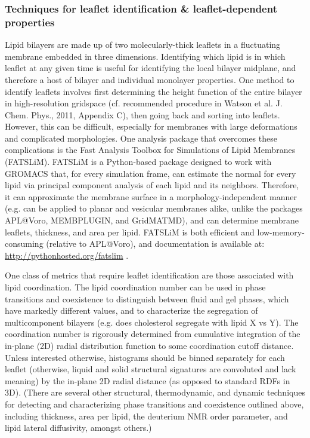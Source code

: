 \documentclass[9pt,bestpractices]{livecoms}
\begin{document}
\subsubsection{Techniques for leaflet identification \& leaflet-dependent properties}
\label{subsubsec:leafid-props}
Lipid bilayers are made up of two molecularly-thick leaflets in a fluctuating membrane embedded in three dimensions.
Identifying which lipid is in which leaflet at any given time is useful for identifying the local bilayer midplane, and therefore a host of bilayer and individual monolayer properties.
One method to identify leaflets involves first determining the height function of the entire bilayer in high-resolution gridspace (cf. recommended procedure in Watson et al. J. Chem. Phys., 2011, Appendix C), then going back and sorting into leaflets.
However, this can be difficult, especially for membranes with large deformations and complicated morphologies.
One analysis package that overcomes these complications is the Fast Analysis Toolbox for Simulations of Lipid Membranes (FATSLiM).
FATSLiM is a Python-based package designed to work with GROMACS that, for every simulation frame, can estimate the normal for every lipid via principal component analysis of each lipid and its neighbors.
Therefore, it can approximate the membrane surface in a morphology-independent manner (e.g. can be applied to planar and vesicular membranes alike, unlike the packages APL@Voro, MEMBPLUGIN, and GridMATMD), and can determine membrane leaflets, thickness, and area per lipid.
FATSLiM is both efficient and low-memory-consuming (relative to APL@Voro), and documentation is available at: \url{http://pythonhosted.org/fatslim} \cite{Buchoux2017}.

One class of metrics that require leaflet identification are those associated with lipid coordination.
The lipid coordination number can be used in phase transitions and coexistence to distinguish between fluid and gel phases, which have markedly different values, and to characterize the segregation of multicomponent bilayers (e.g. does cholesterol segregate with lipid X vs Y).
The coordination number is rigorously determined from cumulative integration of the in-plane (2D) radial distribution function to some coordination cutoff distance.
Unless interested otherwise, histograms should be binned separately for each leaflet (otherwise, liquid and solid structural signatures are convoluted and lack meaning) by the in-plane 2D radial distance (as opposed to standard RDFs in 3D).
(There are several other structural, thermodynamic, and dynamic techniques for detecting and characterizing phase transitions and coexistence outlined above, including thickness, area per lipid, the deuterium NMR order parameter, and lipid lateral diffusivity, amongst others.)
\end{document}
